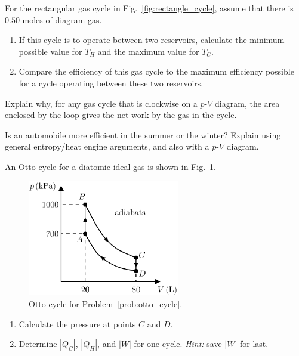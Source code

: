 \begin{problem} 
  For the rectangular gas cycle in Fig.~\ref{fig:rectangle_cycle},
  assume that there is $0.50$ moles of diagram gas.
  \begin{enumerate}
  \item If this cycle is to operate between two reservoirs, calculate
    the minimum possible value for $T_H$ and the maximum value for
    $T_C$.
  \item Compare the efficiency of this gas cycle to the maximum
    efficiency possible for a cycle operating between these two
    reservoirs.
  \end{enumerate}
\end{problem}

\begin{problem} 
  Explain why, for any gas cycle that is clockwise on a $p$-$V$
  diagram, the area enclosed by the loop gives the net work by the gas
  in the cycle.
\end{problem}

\begin{problem} 
  Is an automobile more efficient in the summer or the winter?
  Explain using general entropy/heat engine arguments, and also with a
  $p$-$V$ diagram.
\end{problem}

\begin{problem} 
  An Otto cycle for a diatomic ideal gas is shown in
  Fig.~\ref{fig:otto_cycle_hw}. 
  \begin{figure}
    \begin{center}
      \includegraphics[width=2.6in]{heat_engines/otto_cycle_hw.eps}
      \caption{Otto cycle for Problem~\ref{prob:otto_cycle}.}
      \label{fig:otto_cycle_hw}
    \end{center}
  \end{figure}
   \begin{enumerate}
   \item Calculate the pressure at points $C$ and $D$.
   \item Determine $|Q_C|$, $|Q_H|$, and $|W|$ for one cycle.  {\it
       Hint:} save $|W|$ for last.
   \end{enumerate}
   \label{prob:otto_cycle}
\end{problem}

